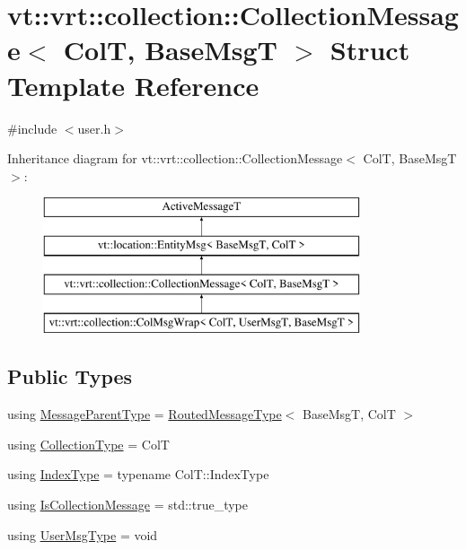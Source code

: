 \hypertarget{structvt_1_1vrt_1_1collection_1_1_collection_message}{}\section{vt\+:\+:vrt\+:\+:collection\+:\+:Collection\+Message$<$ ColT, Base\+MsgT $>$ Struct Template Reference}
\label{structvt_1_1vrt_1_1collection_1_1_collection_message}


{\ttfamily \#include $<$user.\+h$>$}

Inheritance diagram for vt\+:\+:vrt\+:\+:collection\+:\+:Collection\+Message$<$ ColT, Base\+MsgT $>$\+:\begin{figure}[H]
\begin{center}
\leavevmode
\includegraphics[height=4.000000cm]{structvt_1_1vrt_1_1collection_1_1_collection_message}
\end{center}
\end{figure}
\subsection*{Public Types}
\begin{DoxyCompactItemize}
\item 
using \hyperlink{structvt_1_1vrt_1_1collection_1_1_collection_message_a889217019ccfbc6822138d2e007c53b4}{Message\+Parent\+Type} = \hyperlink{namespacevt_1_1vrt_1_1collection_a1bbc628be0955797f2d45227ee526346}{Routed\+Message\+Type}$<$ Base\+MsgT, ColT $>$
\item 
using \hyperlink{structvt_1_1vrt_1_1collection_1_1_collection_message_afa8f7f5da0139ffa449144d8d35d7fe3}{Collection\+Type} = ColT
\item 
using \hyperlink{structvt_1_1vrt_1_1collection_1_1_collection_message_a324978c38e67d1bfa86c8db172e77594}{Index\+Type} = typename Col\+T\+::\+Index\+Type
\item 
using \hyperlink{structvt_1_1vrt_1_1collection_1_1_collection_message_a186fceb015a3415a482d99851432222b}{Is\+Collection\+Message} = std\+::true\+\_\+type
\item 
using \hyperlink{structvt_1_1vrt_1_1collection_1_1_collection_message_ace5b4eaa94f5b209ae321edd6c0b6c19}{User\+Msg\+Type} = void
\end{DoxyCompactItemize}
